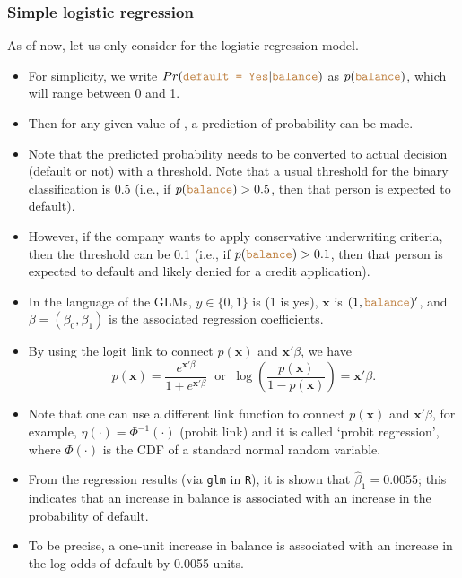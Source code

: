 \documentclass[ignorenonframetext,]{beamer}
\begin{document}
\begin{frame}[allowframebreaks]
\frametitle{Simple logistic regression}


As of now, let us only consider  for the logistic regression model.
\begin{itemize}
	\item For simplicity, we write $Pr(\texttt{\color{brown}{default = Yes}} | \texttt{\color{brown}{balance}})$ as $p( \texttt{\color{brown}{balance}})$, which will range between 0 and 1.
	\item Then for any given value of , a prediction of  probability can be made.
	\item Note that the predicted probability needs to be converted to actual decision (default or not) with a threshold. Note that a usual threshold for the binary classification is 0.5 (i.e., if $p( \texttt{\color{brown}{balance}})>0.5$, then that person is expected to default).
	\item However, if the company wants to apply conservative underwriting criteria, then the threshold can be 0.1 (i.e., if $p( \texttt{\color{brown}{balance}})>0.1$, then that person is expected to default and likely denied for a credit application).
\end{itemize}

\framebreak


\begin{itemize}
\item In the language of the GLMs, $y \in \{0, 1\}$ is   (1 is yes), $\mathbf{x}$ is $(1, \texttt{\color{brown}{balance}})'$, and $\beta=(\beta_0, \beta_1)$ is the associated regression coefficients.
\item By using the logit link to connect $p(\mathbf{x})$ and $\mathbf{x}'\beta$, we have
$$
p(\mathbf{x}) = \frac{e^{\mathbf{x}'\beta}}{1+ e^{\mathbf{x}'\beta}} \ \text{ or } \ \log\left(\frac{p(\mathbf{x})}{1-p(\mathbf{x})}\right) = \mathbf{x}'\beta.
$$
\item Note that one can use a different link function to connect $p(\mathbf{x})$ and $\mathbf{x}'\beta$, for example, $\eta(\cdot) = \Phi^{-1}(\cdot)$ (probit link) and it is called `probit regression', where $\Phi(\cdot)$ is the CDF of a standard normal random variable.
\end{itemize}

\framebreak

\begin{itemize}
\item From the regression results (via \texttt{glm} in \texttt{R}), it is shown that $\hat{\beta}_1 =0.0055$; this indicates that an increase in balance is associated with an
increase in the probability of default. 
\item To be precise, a one-unit increase in balance is associated with an increase in the log odds of default by 0.0055 units.
\end{itemize}


\end{frame}
\end{document}
